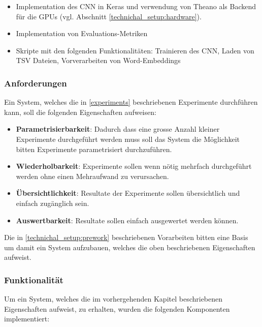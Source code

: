\begin{itemize}[noitemsep]
	\item Implementation des CNN in Keras und verwendung von Theano \cite{theanoCitShort} als Backend für die GPUs (vgl. Abschnitt \ref{technichal_setup:hardware}).
	\item Implementation von Evaluations-Metriken
	\item Skripte mit den folgenden Funktionalitäten: Trainieren des CNN, Laden von TSV Dateien, Vorverarbeiten von Word-Embeddings
\end{itemize}

\subsubsection{Anforderungen}
\label{technical_setup:requirements}
Ein System, welches die in \ref{experiments} beschriebenen Experimente durchführen kann, soll die folgenden Eigenschaften aufweisen:

\begin{itemize}
	\item \textbf{Parametrisierbarkeit}: Dadurch dass eine grosse Anzahl kleiner Experimente durchgeführt werden muss soll das System die Möglichkeit bitten Experimente parametrisiert durchzuführen.
	\item \textbf{Wiederholbarkeit}: Experimente sollen wenn nötig mehrfach durchgeführt werden ohne einen Mehraufwand zu verursachen. 
	\item \textbf{Übersichtlichkeit}: Resultate der Experimente sollen übersichtlich und einfach zugänglich sein.
	\item \textbf{Auswertbarkeit}: Resultate sollen  einfach ausgewertet werden können.
\end{itemize}

Die in \ref{technichal_setup:prework} beschriebenen Vorarbeiten bitten eine Basis um damit ein System aufzubauen, welches die oben beschriebenen Eigenschaften aufweist.
\subsubsection{Funktionalität}
\label{technical_setup:functionality}
Um ein System, welches die im vorhergehenden Kapitel beschriebenen Eigenschaften aufweist, zu erhalten, wurden die folgenden Komponenten implementiert:

